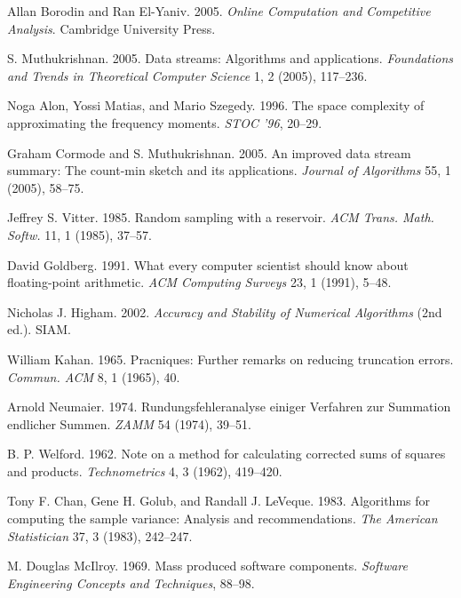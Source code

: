 \documentclass[sigconf]{acmart}
\begin{document}
\begin{thebibliography}{99}

Allan Borodin and Ran El-Yaniv. 2005.
\textit{Online Computation and Competitive Analysis}.
Cambridge University Press.

S. Muthukrishnan. 2005.
Data streams: Algorithms and applications.
\textit{Foundations and Trends in Theoretical Computer Science} 1, 2 (2005), 117--236.

Noga Alon, Yossi Matias, and Mario Szegedy. 1996.
The space complexity of approximating the frequency moments.
\textit{STOC '96}, 20--29.

Graham Cormode and S. Muthukrishnan. 2005.
An improved data stream summary: The count-min sketch and its applications.
\textit{Journal of Algorithms} 55, 1 (2005), 58--75.

Jeffrey S. Vitter. 1985.
Random sampling with a reservoir.
\textit{ACM Trans. Math. Softw.} 11, 1 (1985), 37--57.

David Goldberg. 1991.
What every computer scientist should know about floating-point arithmetic.
\textit{ACM Computing Surveys} 23, 1 (1991), 5--48.

Nicholas J. Higham. 2002.
\textit{Accuracy and Stability of Numerical Algorithms} (2nd ed.).
SIAM.

William Kahan. 1965.
Pracniques: Further remarks on reducing truncation errors.
\textit{Commun. ACM} 8, 1 (1965), 40.

Arnold Neumaier. 1974.
Rundungsfehleranalyse einiger Verfahren zur Summation endlicher Summen.
\textit{ZAMM} 54 (1974), 39--51.

B. P. Welford. 1962.
Note on a method for calculating corrected sums of squares and products.
\textit{Technometrics} 4, 3 (1962), 419--420.

Tony F. Chan, Gene H. Golub, and Randall J. LeVeque. 1983.
Algorithms for computing the sample variance: Analysis and recommendations.
\textit{The American Statistician} 37, 3 (1983), 242--247.

M. Douglas McIlroy. 1969.
Mass produced software components.
\textit{Software Engineering Concepts and Techniques}, 88--98.


\end{thebibliography}
\end{document}
